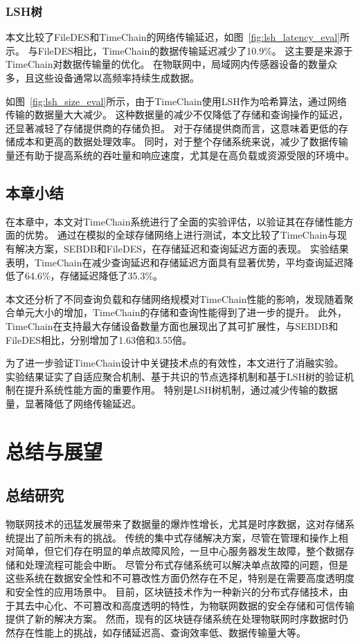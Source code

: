 \subsection{LSH树}
本文比较了FileDES和TimeChain的网络传输延迟，如图~\autoref{fig:lsh_latency_eval}所示。
与FileDES相比，TimeChain的数据传输延迟减少了10.9\%。
这主要是来源于TimeChain对数据传输量的优化。
在物联网中，局域网内传感器设备的数量众多，且这些设备通常以高频率持续生成数据。

如图~\autoref{fig:lsh_size_eval}所示，由于TimeChain使用LSH作为哈希算法，通过网络传输的数据量大大减少。
这种数据量的减少不仅降低了存储和查询操作的延迟，还显著减轻了存储提供商的存储负担。
对于存储提供商而言，这意味着更低的存储成本和更高的数据处理效率。
同时，对于整个存储系统来说，减少了数据传输量还有助于提高系统的吞吐量和响应速度，尤其是在高负载或资源受限的环境中。

\section{本章小结}
在本章中，本文对TimeChain系统进行了全面的实验评估，以验证其在存储性能方面的优势。
通过在模拟的全球存储网络上进行测试，本文比较了TimeChain与现有解决方案，SEBDB和FileDES，在存储延迟和查询延迟方面的表现。
实验结果表明，TimeChain在减少查询延迟和存储延迟方面具有显著优势，平均查询延迟降低了64.6\%，存储延迟降低了35.3\%。

本文还分析了不同查询负载和存储网络规模对TimeChain性能的影响，发现随着聚合单元大小的增加，TimeChain的存储和查询性能得到了进一步的提升。
此外，TimeChain在支持最大存储设备数量方面也展现出了其可扩展性，与SEBDB和FileDES相比，分别增加了1.63倍和3.55倍。

为了进一步验证TimeChain设计中关键技术点的有效性，本文进行了消融实验。
实验结果证实了自适应聚合机制、基于共识的节点选择机制和基于LSH树的验证机制在提升系统性能方面的重要作用。
特别是LSH树机制，通过减少传输的数据量，显著降低了网络传输延迟。

\chapter{总结与展望}
\section{总结研究}
物联网技术的迅猛发展带来了数据量的爆炸性增长，尤其是时序数据，这对存储系统提出了前所未有的挑战。
传统的集中式存储解决方案，尽管在管理和操作上相对简单，但它们存在明显的单点故障风险，一旦中心服务器发生故障，整个数据存储和处理流程可能会中断。
尽管分布式存储系统可以解决单点故障的问题，但是这些系统在数据安全性和不可篡改性方面仍然存在不足，特别是在需要高度透明度和安全性的应用场景中。
目前，区块链技术作为一种新兴的分布式存储技术，由于其去中心化、不可篡改和高度透明的特性，为物联网数据的安全存储和可信传输提供了新的解决方案。
然而，现有的区块链存储系统在处理物联网时序数据时仍然存在性能上的挑战，如存储延迟高、查询效率低、数据传输量大等。

